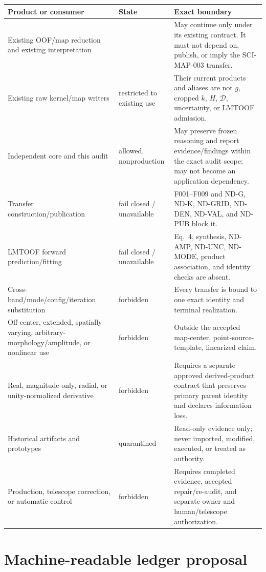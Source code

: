 \documentclass[10pt]{article}
\newcommand{\code}[1]{\texttt{\detokenize{#1}}}
\begin{document}
\begin{longtable}{@{}L{0.25\textwidth}L{0.18\textwidth}L{0.49\textwidth}@{}}
\toprule
Product or consumer & State & Exact boundary \\
\midrule
\endhead
Existing OOF/map reduction and existing interpretation &
\code{existing_use_only} &
May continue only under its existing contract.  It must not depend on,
publish, or imply the SCI-MAP-003 transfer. \\
Existing raw kernel/map writers &
restricted to existing use &
Their current products and aliases are not $g$, cropped $k$, $H$,
$\mathcal D$, uncertainty, or LMTOOF admission. \\
Independent core and this audit &
allowed, nonproduction &
May preserve frozen reasoning and report evidence/findings within the exact
audit scope; may not become an application dependency. \\
Transfer construction/publication &
fail closed / unavailable &
F001--F009 and ND-G, ND-K, ND-GRID, ND-DEN, ND-VAL, and ND-PUB block it. \\
LMTOOF forward prediction/fitting &
fail closed / unavailable &
Eq.~4, synthesis, ND-AMP, ND-UNC, ND-MODE, product association, and identity
checks are absent. \\
Cross-band/mode/config/iteration substitution &
forbidden &
Every transfer is bound to one exact identity and terminal realization. \\
Off-center, extended, spatially varying, arbitrary-morphology/amplitude, or
nonlinear use &
forbidden &
Outside the accepted map-center, point-source-template, linearized claim. \\
Real, magnitude-only, radial, or unity-normalized derivative &
forbidden &
Requires a separate approved derived-product contract that preserves primary
parent identity and declares information loss. \\
Historical artifacts and prototypes &
quarantined &
Read-only evidence only; never imported, modified, executed, or treated as
authority. \\
Production, telescope correction, or automatic control &
forbidden &
Requires completed evidence, accepted repair/re-audit, and separate owner and
human/telescope authorization. \\
\bottomrule
\end{longtable}

\section{Machine-readable ledger proposal}
\end{document}
